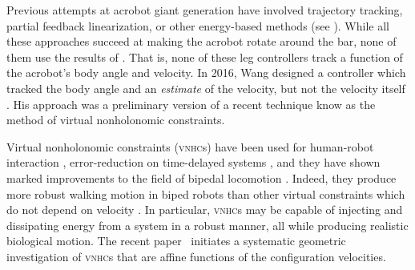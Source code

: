 \documentclass[journal,twoside,web, twocolumn]{ieeecolor}
\newcommand*{\vnhcs}{\textsc{vnhc}s\xspace}
\begin{document}
Previous attempts at acrobot giant generation have involved
trajectory tracking, partial feedback linearization, or other energy-based
methods
(see
\cite{energy_pumping_robotic_swinging,swingup_giant_acrobot,dynamical_servo_acrobot_vc,control_giant_two_link_gymnastic_robot}
).
While all these approaches succeed at making the acrobot rotate around the
bar, none of them use the results of \cite{pendulum_length_giant_gymnastics}.
That is, none of these leg controllers track a function of the acrobot's body
angle and velocity.
In 2016, Wang designed a controller which tracked the
body angle and an \textit{estimate} of the velocity, but not the velocity itself
\cite{xingbo_thesis}.
His approach was a preliminary version of a recent technique know as the method
of virtual nonholonomic constraints.

Virtual nonholonomic constraints (\vnhcs) have been used for human-robot interaction
\cite{vnhc_human_robot_cooperation,psd_based_vnhc_redundant_manipulator,haptic_vnhc},
error-reduction on time-delayed systems \cite{vnhc_time_delay_teleop},
and they have shown marked improvements to the field of bipedal locomotion 
\cite{nhvc_dynamic_walking,
hybrid_zero_dynamics_bipedal_nhvcs,output_nhvc_bipedal_control}.
Indeed, they produce more robust walking motion in biped robots than
other virtual constraints which do not depend on velocity
\cite{nhvc_incline_walking}.
In particular, \vnhcs may be capable of injecting and
dissipating energy from a system in a robust manner, all while producing
realistic biological motion. The recent paper~\cite{SimStraBloCol23} initiates a systematic geometric investigation of \vnhcs that are affine functions of the configuration velocities.
\end{document}
